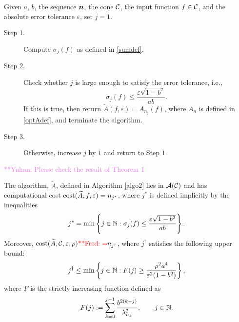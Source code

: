 \documentclass[graybox,footinfo]{svmult}
\newcommand{\frednote}[1]{  {\textcolor{red}  {\mbox{**Fred:} #1}}}
\newcommand{\yuhannote}[1]{ {\textcolor{violet}  {\mbox{**Yuhan:} #1}}}
\begin{document}
\begin{algo}\label{algo2}
Given $a$, $b$, the sequence ${\boldsymbol{n}}$, the cone ${\mathcal{C}}$, the input function $f \in {\mathcal{C}}$, and the absolute error tolerance $\varepsilon$, set $j=1$.
\begin{description}
\item[Step 1.] Compute $\sigma_{j}(f)$ as defined in \eqref{sumdef}.
\item[Step 2.] Check whether $j$ is large enough to satisfy the error tolerance, i.e.,
    \begin{equation*}\label{covcrit}
          \sigma_{j}(f) \le \frac{\varepsilon\sqrt{1 - b^2}}{ab} .
    \end{equation*}
    If this is true, then return $\widetilde{A}(f,\varepsilon) = A_{n_{j}}(f)$, where $A_n$ is defined in \eqref{optAdef}, and terminate the algorithm.
\item[Step 3.] Otherwise, increase $j$ by $1$ and return to Step $1$.
\end{description}
\end{algo}
\yuhannote{Please check the result of Theorem 1} 
\begin{theorem}\label{thm:compcost}
The algorithm, $\widetilde{A}$, defined in Algorithm \ref{algo2} lies in ${\mathcal{A}}({\mathcal{C}})$ and has computational cost $\textup{cost}(\widetilde{A},f,\varepsilon)=n_{j^*}$, where $j^*$ is defined implicitly by the inequalities 
\begin{equation} \label{eq:OurAlgjstar}
j^* = \min\left \{ j \in \bbN : \sigma_{j}(f) \le \frac{\varepsilon\sqrt{1 - b^2}}{ab}  \right\}.
\end{equation}
Moreover, $\textup{cost}(\widetilde{A},\calC,\varepsilon,\rho) \frednote{=} n_{j^\dagger}$, where $j^\dagger$ satisfies the following upper bound:
\begin{equation} \label{jdagger}
j^\dagger \le \min \left \{j \in \bbN : F(j) \ge \frac{\rho^2 a^4}{\varepsilon^2(1 - b^2)} \right\},
\end{equation}
where $F$ is the strictly increasing function defined as
\begin{equation} \label{jsum}
F(j): = \sum_{k=0}^{j-1} \frac{b^{2(k-j)}}{\lambda_{n_{k}}^2}, \qquad j \in \N.
\end{equation}
\end{theorem}
\end{document}
